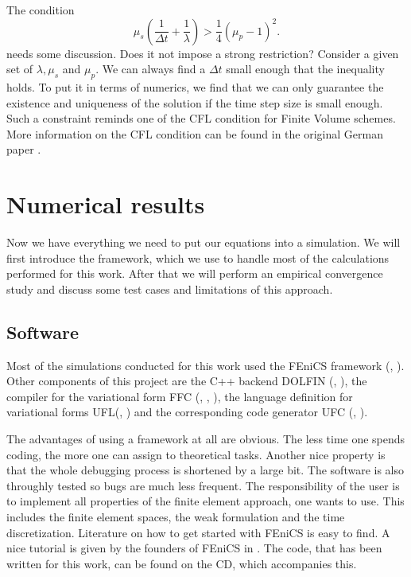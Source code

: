\documentclass[12pt,a4paper,twoside, open=right]{scrreprt}
\theoremstyle{definition}
\theoremstyle{plain}
\begin{document}
The condition 
\begin{equation}
\mu_s\left(\frac{1}{\Delta t}+\frac{1}{\lambda}\right)>\frac{1}{4}(\mu_p-1)^2.
\end{equation} needs some discussion. Does it not impose a strong restriction? Consider a given set of $\lambda,\mu_s$ and $\mu_p$. We can always find a $\Delta t$ small enough that the inequality holds. To put it in terms of numerics, we find that we can only guarantee the existence and uniqueness of the solution if the time step size is small enough. Such a constraint reminds one of the \textsc{CFL} condition for Finite Volume schemes. More information on the CFL condition can be found in the original German paper \cite{Courant1928}.
\section{Numerical results}
Now we have everything we need to put our equations into a simulation. We will first introduce the framework, which we use to handle most of the calculations performed for this work. After that we will perform an empirical convergence study and discuss some test cases and limitations of this approach.
\subsection{Software}
Most of the simulations conducted for this work used the FEniCS framework (\cite{AlnaesBlechta2015a}, \cite{LoggMardalEtAl2012a}). Other components of this project are the C++ backend DOLFIN (\cite{LoggWells2010a}, \cite{LoggWellsEtAl2012a}), the compiler for the variational form FFC (\cite{KirbyLogg2006a}, \cite{LoggOlgaardEtAl2012a}, \cite{OlgaardWells2010b}), the language definition for variational forms UFL(\cite{AlnaesEtAl2012}, \cite{Alnaes2012a}) and the corresponding code generator UFC (\cite{AlnaesLoggEtAl2009a}, \cite{AlnaesLoggEtAl2012a}).
\par 
The advantages of using a framework at all are obvious. The less time one spends coding, the more one can assign to theoretical tasks. Another nice property is that the whole debugging process is shortened by a large bit. The software is also throughly tested so bugs are much less frequent. The responsibility of the user is to implement all properties of the finite element approach, one wants to use. This includes the finite element spaces, the weak formulation and the time discretization. Literature on how to get started with FEniCS is easy to find. A nice tutorial is given by the founders of FEniCS in  \cite{Langtangen2017a}. The code, that has been written for this work, can be found on the CD, which accompanies this. 
\end{document}
